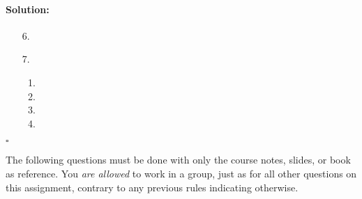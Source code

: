 \documentclass[11pt,letterpaper]{article}
\newif \iftemplate \templatetrue
\newenvironment{solution}{\paragraph{Solution:}}{\hfill$\square$}
\theoremstyle{definition}
\begin{document}
\iftemplate
\begin{solution}
\begin{enumerate}
\item[6.]
\item[7.]
\begin{enumerate}
\item
\item
\item
\item
\end{enumerate}
\end{enumerate}
\end{solution}
\newpage
\fi

The following questions must be done with only the course notes, slides, or book as reference.
You \emph{are allowed} to work in a group, just as for all other questions on this assignment, contrary to any previous rules indicating otherwise.
\end{document}
